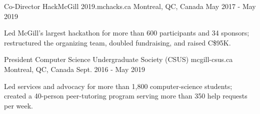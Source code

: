 

\begin{cventries}

  \cventry
    {Co-Director} %
    {HackMcGill} %
    {2019.mchacks.ca} %
    {Montreal, QC, Canada} %
    {May 2017 - May 2019} %
    {
      \begin{cvitems} %
        \item {Led McGill's largest hackathon for more than 600 participants and 34 sponsors; restructured the organizing team, doubled fundraising, and raised C\$95K.}
      \end{cvitems}
    }

  \cventry
    {President} %
    {Computer Science Undergraduate Society (CSUS)} %
    {mcgill-csus.ca} %
    {Montreal, QC, Canada} %
    {Sept. 2016 - May 2019} %
    {
      \begin{cvitems} %
        \item {Led services and advocacy for more than 1,800 computer-science students; created a 40-person peer-tutoring program serving more than 350 help requests per week.}
      \end{cvitems}
    }
    
    
\end{cventries}
